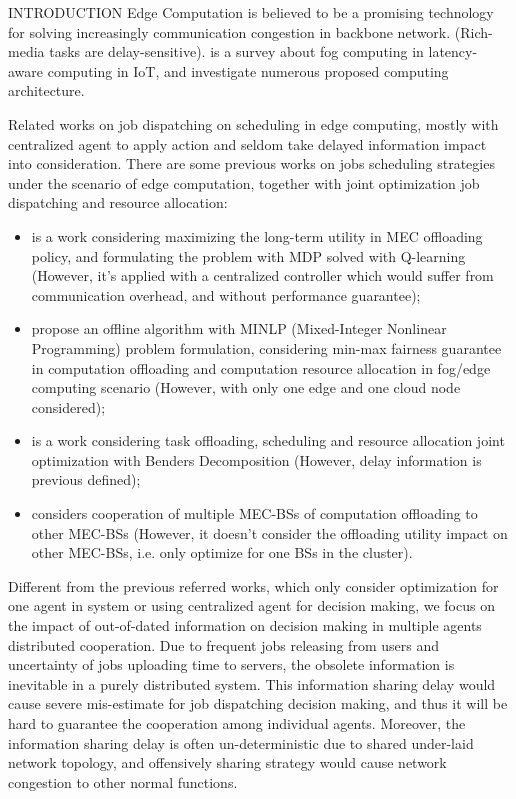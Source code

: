 \documentclass[10pt, conference, letterpaper]{IEEEtran}
\begin{document}
    \begin{section}{INTRODUCTION}
        \label{sec:introduction}
        Edge Computation is believed to be a promising technology for solving increasingly communication congestion in backbone network.
        (Rich-media tasks are delay-sensitive).
        \cite{Naha2018} is a survey about fog computing in latency-aware computing in IoT, and investigate numerous proposed computing architecture.

        Related works on job dispatching on scheduling in edge computing, mostly with centralized agent to apply action and seldom take delayed information impact into consideration.
        There are some previous works on jobs scheduling strategies under the scenario of edge computation, together with joint optimization job dispatching and resource allocation:
        \begin{itemize}
            \item \cite{Zheng2019} is a work considering maximizing the long-term utility in MEC offloading policy, and formulating the problem with MDP solved with Q-learning (However, it's applied with a centralized controller which would suffer from communication overhead, and without performance guarantee);
            \item \cite{Du2018} propose an offline algorithm with MINLP (Mixed-Integer Nonlinear Programming) problem formulation, considering min-max fairness guarantee in computation offloading and computation resource allocation in fog/edge computing scenario (However, with only one edge and one cloud node considered);
            \item \cite{Alameddine2019} is a work considering task offloading, scheduling and resource allocation joint optimization with Benders Decomposition (However, delay information is previous defined);
            \item \cite{Fan2017} considers cooperation of multiple MEC-BSs of computation offloading to other MEC-BSs (However, it doesn't consider the offloading utility impact on other MEC-BSs, i.e. only optimize for one BSs in the cluster).
        \end{itemize}
        
        Different from the previous referred works, which only consider optimization for one agent in system or using centralized agent for decision making, we focus on the impact of out-of-dated information on decision making in multiple agents distributed cooperation.
        Due to frequent jobs releasing from users and uncertainty of jobs uploading time to servers, the obsolete information is inevitable in a purely distributed system.
        This information sharing delay would cause severe mis-estimate for job dispatching decision making, and thus it will be hard to guarantee the cooperation among individual agents.
        Moreover, the information sharing delay is often un-deterministic due to shared under-laid network topology, and offensively sharing strategy would cause network congestion to other normal functions.


\end{section}
\end{document}

